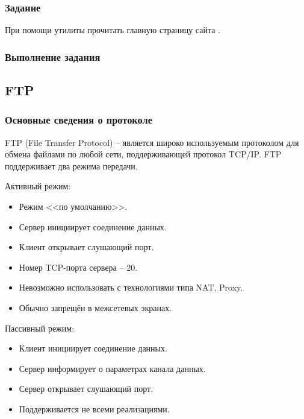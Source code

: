 \subsubsection{Задание}

При помощи утилиты  прочитать главную страницу сайта .

\subsubsection{Выполнение задания}



\subsection{FTP}

\subsubsection{Основные сведения о протоколе}

FTP (File Transfer Protocol) -- является широко используемым протоколом для обмена файлами по любой сети, поддерживающей протокол TCP/IP. FTP поддерживает два режима передачи.

Активный режим:

\begin{itemize}
	\item Режим <<по умолчанию>>.
	\item Сервер инициирует соединение данных.
	\item Клиент открывает слушающий порт.
	\item Номер TCP-порта сервера – 20.
	\item Невозможно использовать с технологиями типа NAT, Proxy.
	\item Обычно запрещён в межсетевых экранах.
\end{itemize}

Пассивный режим:

\begin{itemize}
	\item Клиент инициирует соединение данных.
	\item Сервер информирует о параметрах канала данных.
	\item Сервер открывает слушающий порт.
	\item Поддерживается не всеми реализациями.
\end{itemize}

